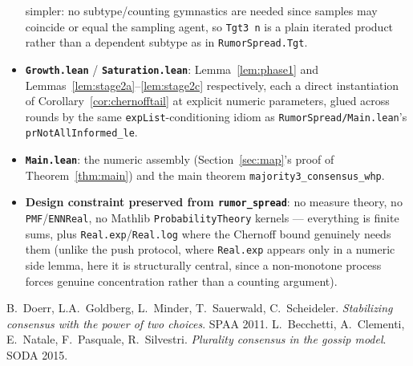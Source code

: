 \documentclass[11pt]{article}
\begin{document}
\begin{itemize}[leftmargin=2em]
  simpler: no subtype/counting gymnastics are needed since samples may
  coincide or equal the sampling agent, so \texttt{Tgt3 n} is a plain
  iterated product rather than a dependent subtype as in
  \texttt{RumorSpread.Tgt}.
\item \textbf{\texttt{Growth.lean}} / \textbf{\texttt{Saturation.lean}}:
  Lemma~\ref{lem:phase1} and Lemmas~\ref{lem:stage2a}--\ref{lem:stage2c}
  respectively, each a direct instantiation of
  Corollary~\ref{cor:chernofftail} at explicit numeric parameters, glued
  across rounds by the same \texttt{expList}-conditioning idiom as
  \texttt{RumorSpread/Main.lean}'s \texttt{prNotAllInformed\_le}.
\item \textbf{\texttt{Main.lean}}: the numeric assembly
  (Section~\ref{sec:map}'s proof of Theorem~\ref{thm:main}) and the main
  theorem \texttt{majority3\_consensus\_whp}.
\item \textbf{Design constraint preserved from \texttt{rumor\_spread}}: no
  measure theory, no \texttt{PMF}/\texttt{ENNReal}, no Mathlib
  \texttt{ProbabilityTheory} kernels — everything is finite sums, plus
  \texttt{Real.exp}/\texttt{Real.log} where the Chernoff bound genuinely
  needs them (unlike the push protocol, where \texttt{Real.exp} appears
  only in a numeric side lemma, here it is structurally central, since a
  non-monotone process forces genuine concentration rather than a counting
  argument).
\end{itemize}

\begin{thebibliography}{9}
 B.~Doerr, L.A.~Goldberg, L.~Minder, T.~Sauerwald,
C.~Scheideler. \emph{Stabilizing consensus with the power of two choices}.
SPAA 2011.
 L.~Becchetti, A.~Clementi, E.~Natale, F.~Pasquale,
R.~Silvestri. \emph{Plurality consensus in the gossip model}. SODA 2015.
\end{thebibliography}
\end{document}
